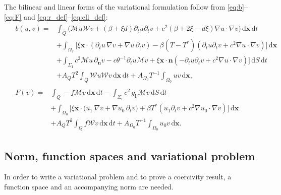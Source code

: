 \documentclass[a4paper]{article}
\theoremstyle{plain}
\theoremstyle{definition}
\newcommand{\operator}[1]{\mathcal{#1}}
\newcommand{\dx}{{\,\mathrm{d}\vect x}}
\newcommand{\dt}{{\,\mathrm{d}t}}
\newcommand{\dS}{{\,\mathrm{d}S}}
\newcommand{\Grad}[1]{\nabla #1}
\newcommand{\TimeDer}{{\partial^{}_t}}
\newcommand{\NormDer}{{\partial_{\bm{n}}}}
\newcommand{\vect}[1]{\bm{#1}}
\newcommand{\SI}{{\Sigma_{\mathrm I}}}
\newcommand{\gI}{{g_{\mathrm I}}}
\newcommand{\oW}{{\operator{W}}}
\newcommand{\OZ}{{\Omega_0}}
\begin{document}
The bilinear and linear forms of the variational formulation follow from \eqref{eq:b}--\eqref{eq:F} and \eqref{eq:r_def}--\eqref{eq:ell_def}:
\begin{align}\label{eq:def:bilin}
	 & \begin{aligned}
		   b(u,v) =
		    & \int_Q \big(
		   \operator{M} u \operator{W} v
		   +(\beta + \xi d)\TimeDer{u}\TimeDer{v} + c^2  (\beta + 2\xi - d\xi)\Grad u \cdot \Grad v
		   \big) \dx \dt                                                                                              \\
		    & + \int_{\Omega_T}\big[ \xi \vect{x} \cdot (\TimeDer{u}\,\Grad v + \Grad u\, \TimeDer{v})
- \beta (T-T^*)(\TimeDer{u} \TimeDer{v}	+ c^2 \Grad u \cdot \Grad v)\big] \dx                           \\
& + \int_{\SI} c^2 \operator{M} u\,\NormDer{v} - c \theta^{-1} \TimeDer{u} \operator{M} v
		   + \xi \vect{x} \cdot \vect{n} ( - \TimeDer{u} \TimeDer{v} + c^2 \Grad u \cdot \Grad v )\big] \dS \dt \\
		    & + A_Q T^2 \int_Q \operator{W} u \operator{W} v \dx \dt + A_\OZ T^{-1}\int_\OZ u v \dx,
	   \end{aligned}
	\\ \label{eq:def:lin}
	 & \begin{aligned}
		   F(v) =
		    & \int_Q -f\operator{M} v \dx\dt
		   - \int_{\SI} c^2 \,\gI\,\operator{M} v \dS \dt                                                  \\
		    & + \int_{\Omega_0}\big[\xi \vect{x} \cdot \big( u_1\,\Grad v+ \Grad u_0\, \TimeDer{v}\big)
		   +\beta T^* \left(u_1 \TimeDer{v}+ c^2 \Grad u_0\cdot \Grad v\right)\big]\dx                  \\
		    & +A_Q T^2 \int_Q  f \oW v \dx \dt + A_\OZ T^{-1}\int_\OZ u_0 v \dx.
	   \end{aligned}
\end{align}


\subsection{Norm, function spaces and variational problem}\label{sec:spaces}

In order to write a variational problem and to prove a coercivity result, a function space and an accompanying norm are needed.
\end{document}
